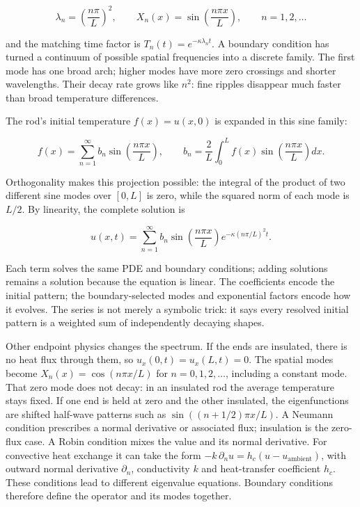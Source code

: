 \[
\lambda_n=\left(\frac{n\pi}{L}\right)^2,
\qquad
X_n(x)=\sin\left(\frac{n\pi x}{L}\right),
\qquad n=1,2,\ldots
\]

and the matching time factor is \(T_n(t)=e^{-\kappa\lambda_nt}\). A boundary condition has turned a continuum of possible spatial frequencies into a discrete family. The first mode has one broad arch; higher modes have more zero crossings and shorter wavelengths. Their decay rate grows like \(n^2\): fine ripples disappear much faster than broad temperature differences.

The rod's initial temperature \(f(x)=u(x,0)\) is expanded in this sine family:

\[
f(x)=\sum_{n=1}^{\infty}b_n\sin\left(\frac{n\pi x}{L}\right),
\qquad
b_n=\frac{2}{L}\int_0^L f(x)\sin\left(\frac{n\pi x}{L}\right)dx.
\]

Orthogonality makes this projection possible: the integral of the product of two different sine modes over \([0,L]\) is zero, while the squared norm of each mode is \(L/2\). By linearity, the complete solution is

\[
u(x,t)=\sum_{n=1}^{\infty}b_n\sin\left(\frac{n\pi x}{L}\right)e^{-\kappa(n\pi/L)^2t}.
\]

Each term solves the same PDE and boundary conditions; adding solutions remains a solution because the equation is linear. The coefficients encode the initial pattern; the boundary-selected modes and exponential factors encode how it evolves. The series is not merely a symbolic trick: it says every resolved initial pattern is a weighted sum of independently decaying shapes.

Other endpoint physics changes the spectrum. If the ends are insulated, there is no heat flux through them, so \(u_x(0,t)=u_x(L,t)=0\). The spatial modes become \(X_n(x)=\cos(n\pi x/L)\) for \(n=0,1,2,\ldots\), including a constant mode. That zero mode does not decay: in an insulated rod the average temperature stays fixed. If one end is held at zero and the other insulated, the eigenfunctions are shifted half-wave patterns such as \(\sin((n+1/2)\pi x/L)\). A Neumann condition prescribes a normal derivative or associated flux; insulation is the zero-flux case. A Robin condition mixes the value and its normal derivative. For convective heat exchange it can take the form \(-k\,\partial_nu=h_c(u-u_{\mathrm{ambient}})\), with outward normal derivative \(\partial_n\), conductivity \(k\) and heat-transfer coefficient \(h_c\). These conditions lead to different eigenvalue equations. Boundary conditions therefore define the operator and its modes together.

